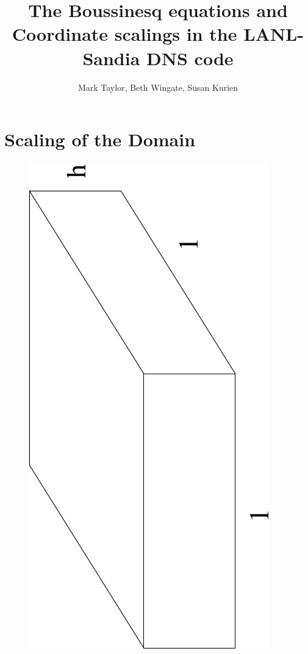 \documentclass[12pt]{article}
\title{The Boussinesq equations and Coordinate scalings in the
  LANL-Sandia DNS code} \author{Mark Taylor, Beth Wingate, Susan Kurien}
\begin{document}
\maketitle

\section{Scaling of the Domain}


\begin{figure}
\begin{center}
\includegraphics[angle=-90,width=4.in]{box}
\caption{ }
\label{F:box}
\end{center}
\end{figure}
\end{document}
